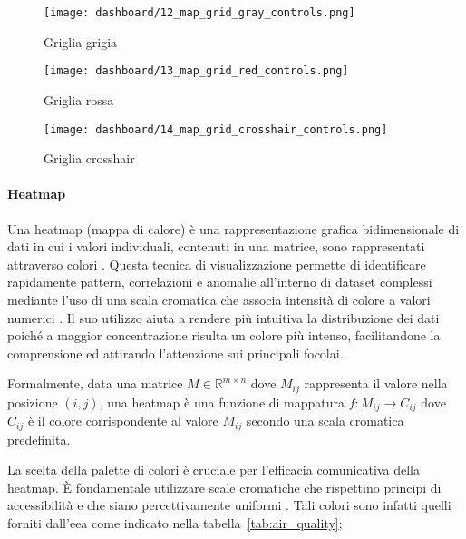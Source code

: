 \newpage

\begin{figure}[H]
  \centering

  \texttt{[image: dashboard/12\_map\_grid\_gray\_controls.png]}
  \caption{Griglia grigia}
  \label{fig:map-grid-gray}

  \hfill

  \centering
  \texttt{[image: dashboard/13\_map\_grid\_red\_controls.png]}
  \caption{Griglia rossa}
  \label{fig:map-grid-red}

  \hfill

  \centering
  \texttt{[image: dashboard/14\_map\_grid\_crosshair\_controls.png]}
  \caption{Griglia crosshair}
  \label{fig:map-grid-crosshair}
\end{figure}

\newpage

\paragraph{Heatmap}

Una heatmap (mappa di calore) è una rappresentazione grafica bidimensionale di dati in cui i valori individuali,
contenuti in una matrice, sono rappresentati attraverso colori \citep{wilkinson2009grammar}.
Questa tecnica di visualizzazione permette di identificare rapidamente pattern, correlazioni e anomalie
all'interno di dataset complessi mediante l'uso di una scala cromatica che associa intensità di colore
a valori numerici \citep{cleveland1993visualizing}. Il suo utilizzo aiuta a rendere più intuitiva la distribuzione
dei dati poiché a maggior concentrazione risulta un colore più intenso, facilitandone la comprensione ed attirando
l'attenzione sui principali focolai.

Formalmente, data una matrice $M \in \mathbb{R}^{m \times n}$ dove $M_{ij}$ rappresenta il valore
nella posizione $(i,j)$, una heatmap è una funzione di mappatura $ f: M_{ij} \rightarrow C_{ij} $
dove $C_{ij}$ è il colore corrispondente al valore $M_{ij}$ secondo una scala cromatica predefinita.

La scelta della palette di colori è cruciale per l'efficacia comunicativa della heatmap.
È fondamentale utilizzare scale cromatiche che rispettino principi di accessibilità e che siano percettivamente
uniformi \citep{ware2012information}.
Tali colori sono infatti quelli forniti dall'\acrfull{eea} come indicato nella tabella~\ref{tab:air_quality};

